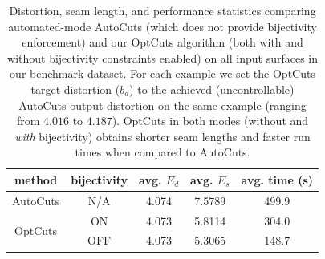 \begin{table}[t]
\centering
\caption{
Distortion, seam length, and performance statistics comparing automated-mode AutoCuts (which does not provide bijectivity enforcement) and our OptCuts algorithm (both with and without bijectivity constraints enabled) on all input surfaces in our benchmark dataset. For each example we set the OptCuts target distortion ($b_d$) to the achieved (uncontrollable) AutoCuts output distortion on the same example (ranging from $4.016$ to $4.187$). OptCuts in both modes (without and \emph{with} bijectivity) obtains shorter seam lengths and faster run times when compared to AutoCuts.}
\label{tb:comp_AutoCuts}
\begin{tabular}{|c|c|c|c|c|}
\hline
method                   & bijectivity & avg. $E_{d}$ & avg. $E_{s}$ & avg. time (s) \\ \hline
AutoCuts                 & N/A         & 4.074        & 7.5789       & 499.9         \\ \hline
\multirow{2}{*}{OptCuts} & ON          & 4.073        & 5.8114       & 304.0         \\
                         & OFF         & 4.073        & 5.3065       & 148.7         \\ \hline
\end{tabular}
\end{table}

